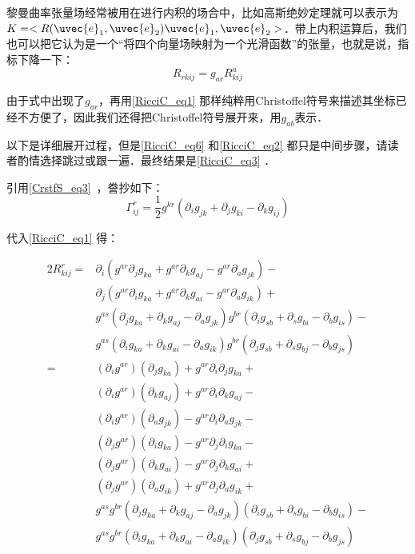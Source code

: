 黎曼曲率张量场经常被用在进行内积的场合中，比如高斯绝妙定理就可以表示为$K=<R(\uvec{e}_1, \uvec{e}_2)\uvec{e}_1, \uvec{e}_2>$．带上内积运算后，我们也可以把它认为是一个“将四个向量场映射为一个光滑函数”的张量，也就是说，指标下降一下：
\begin{equation}
R_{rkij}=g_{ar}R^a_{kij}
\end{equation}

由于式中出现了$g_{ar}$，再用\autoref{RicciC_eq1} 那样纯粹用Christoffel符号来描述其坐标已经不方便了，因此我们还得把Christoffel符号展开来，用$g_{ab}$表示．

以下是详细展开过程，但是\autoref{RicciC_eq6} 和\autoref{RicciC_eq2} 都只是中间步骤，请读者酌情选择跳过或跟一遍．最终结果是\autoref{RicciC_eq3} ．

引用\autoref{CrstfS_eq3}~，誊抄如下：
\begin{equation}
\Gamma^{r}_{ij}=\frac{1}{2}g^{kr}(\partial_ig_{jk}+\partial_jg_{ki}-\partial_kg_{ij})
\end{equation}

代入\autoref{RicciC_eq1} 得：

\begin{equation}\label{RicciC_eq6}
\begin{aligned}
2R^r_{kij}=&\partial_i(g^{ar}\partial_jg_{ka}+g^{ar}\partial_kg_{aj}-g^{ar}\partial_ag_{jk})-\\
&\partial_j(g^{ar}\partial_ig_{ka}+g^{ar}\partial_kg_{ai}-g^{ar}\partial_ag_{ik})+\\
&g^{as}(\partial_jg_{ka}+\partial_kg_{aj}-\partial_ag_{jk})g^{br}(\partial_ig_{sb}+\partial_sg_{bi}-\partial_bg_{is})-\\
&g^{as}(\partial_ig_{ka}+\partial_kg_{ai}-\partial_ag_{ik})g^{br}(\partial_jg_{sb}+\partial_sg_{bj}-\partial_bg_{js})\\
=&(\partial_ig^{ar})(\partial_jg_{ka})+g^{ar}\partial_i\partial_jg_{ka}+\\
&(\partial_ig^{ar})(\partial_kg_{aj})+g^{ar}\partial_i\partial_kg_{aj}-\\
&(\partial_ig^{ar})(\partial_ag_{jk})-g^{ar}\partial_i\partial_ag_{jk}-\\%
&(\partial_jg^{ar})(\partial_ig_{ka})-g^{ar}\partial_j\partial_ig_{ka}-\\
&(\partial_jg^{ar})(\partial_kg_{ai})-g^{ar}\partial_j\partial_kg_{ai}+\\
&(\partial_jg^{ar})(\partial_ag_{ik})+g^{ar}\partial_j\partial_ag_{ik}+\\%
&g^{as}g^{br}(\partial_jg_{ka}+\partial_kg_{aj}-\partial_ag_{jk})(\partial_ig_{sb}+\partial_sg_{bi}-\partial_bg_{is})-\\
&g^{as}g^{br}(\partial_ig_{ka}+\partial_kg_{ai}-\partial_ag_{ik})(\partial_jg_{sb}+\partial_sg_{bj}-\partial_bg_{js})
\end{aligned}
\end{equation}

